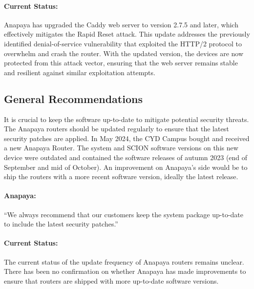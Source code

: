 \paragraph{Current Status:}
Anapaya has upgraded the Caddy web server to version 2.7.5 and later, which effectively mitigates the Rapid Reset attack.
This update addresses the previously identified denial-of-service vulnerability that exploited the HTTP/2 protocol to overwhelm and crash the router.
With the updated version, the devices are now protected from this attack vector, ensuring that the web server remains stable and resilient against similar exploitation attempts.

\subsection{General Recommendations}
\label{sec:general-recommendations}

It is crucial to keep the software up-to-date to mitigate potential security threats.
The Anapaya routers should be updated regularly to ensure that the latest security patches are applied.
In May 2024, the CYD Campus bought and received a new Anapaya Router.
The system and SCION software versions on this new device were outdated and contained the software releases of autumn 2023 (end of September and mid of October).
An improvement on Anapaya's side would be to ship the routers with a more recent software version, ideally the latest release.

\begin{boxH}
\paragraph{Anapaya:}
``We always recommend that our customers keep the system package up-to-date to include the latest security patches.''
\end{boxH}

\paragraph{Current Status:}
The current status of the update frequency of Anapaya routers remains unclear.
There has been no confirmation on whether Anapaya has made improvements to ensure that routers are shipped with more up-to-date software versions.


